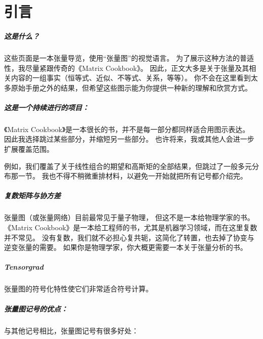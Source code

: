 
\chapter{引言}
\paragraph{这是什么？}
这些页面是一本张量导览，使用“张量图”的视觉语言。
为了展示这种方法的普适性，我尽量紧跟传奇的《Matrix Cookbook》。
因此，正文大多是关于张量及其相关内容的一组事实（恒等式、近似、不等式、关系，等等）。
你不会在这里看到太多原始手册之外的结果，但希望这些图示能为你提供一种新的理解和欣赏方式。

\paragraph{这是一个持续进行的项目：}
《Matrix Cookbook》是一本很长的书，并不是每一部分都同样适合用图示表达。
因此我选择跳过某些部分，并缩短另一些部分。
也许将来，我或其他人会进一步扩展覆盖范围。

例如，我们覆盖了关于线性组合的期望和高斯矩的全部结果，但跳过了一般多元分布那一节。
我也不得不稍微重排材料，以避免一开始就把所有记号都介绍完。

\paragraph{复数矩阵与协方差}
张量图（或张量网络）目前最常见于量子物理，
但这不是一本给物理学家的书。
《Matrix Cookbook》是一本给工程师的书，尤其是机器学习领域，而在这里复数并不常见。
没有复数，我们就不必担心复共轭，这简化了转置，也去掉了协变与逆变张量的需要。
如果你是物理学家，你大概更需要一本关于张量分析的书。

\paragraph{Tensorgrad}
张量图的符号化特性使它们非常适合符号计算。

\paragraph{张量图记号的优点：}
与其他记号相比，张量图记号有很多好处：

